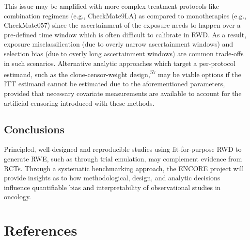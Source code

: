 \documentclass[
  letterpaper,
  DIV=11,
  numbers=noendperiod]{scrartcl}
\begin{document}
This issue may be amplified with more complex treatment protocols like
combination regimens (e.g., CheckMate9LA) as compared to monotherapies
(e.g., CheckMate057) since the ascertainment of the exposure needs to
happen over a pre-defined time window which is often difficult to
calibrate in RWD. As a result, exposure misclassification (due to overly
narrow ascertainment windows) and selection bias (due to overly long
ascertainment windows) are common trade-offs in such scenarios.
Alternative analytic approaches which target a per-protocol estimand,
such as the clone-censor-weight design,\textsuperscript{57} may be
viable options if the ITT estimand cannot be estimated due to the
aforementioned parameters, provided that necessary covariate
measurements are available to account for the artificial censoring
introduced with these methods.

\subsection{Conclusions}\label{conclusions}

Principled, well-designed and reproducible studies using fit-for-purpose
RWD to generate RWE, such as through trial emulation, may complement
evidence from RCTs. Through a systematic benchmarking approach, the
ENCORE project will provide insights as to how methodological, design,
and analytic decisions influence quantifiable bias and interpretability
of observational studies in oncology.

\newpage{}

\section*{References}\label{references}
\end{document}
